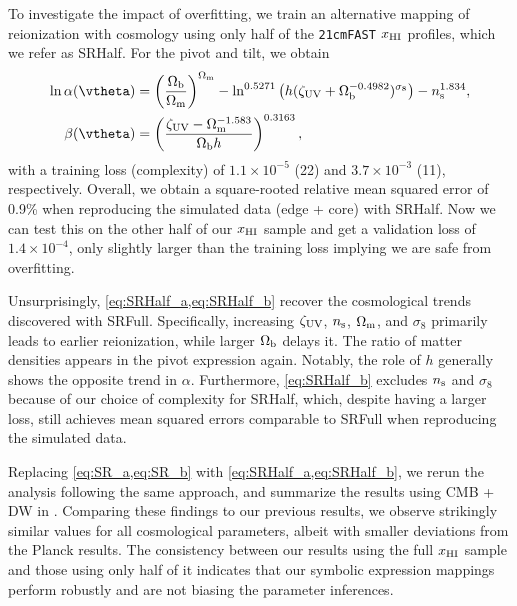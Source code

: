 To investigate the impact of overfitting, we train an alternative
mapping of reionization with cosmology using only half of the
\texttt{21cmFAST} $x_{\mathrm{HI}}$ profiles, which we refer as SRHalf.
For the pivot and tilt, we obtain
%
\begin{align}
\ln\ap(\vtheta) &= \left(\frac{\Omegab}{\Omegam}\right)^{\Omegam} - \ln^{0.5271}{\left(h(\zetaUV + \Omegab^{-0.4982})^{\sigma_8} \right) - \ns^{1.834}}, \label{eq:SRHalf_a} \\
\beta(\vtheta) &= \left( \frac{\zetaUV - \Omegam^{-1.583}}{\Omegab h }\right)^{0.3163}, \label{eq:SRHalf_b}
\end{align}
%
with a training loss (complexity) of $1.1 \times 10^{-5}$ (22) and $3.7 \times 10^{-3}$ (11), respectively. 
Overall, we obtain a square-rooted relative mean squared error of 0.9\% when 
reproducing the simulated data (edge + core) with SRHalf. 
Now we can test this on the other half of our $x_{\mathrm{HI}}$ sample and get a
validation loss of $1.4 \times 10^{-4}$, only slightly larger than the
training loss implying we are safe from overfitting.

Unsurprisingly, \cref{eq:SRHalf_a,eq:SRHalf_b} recover the cosmological trends
discovered with SRFull. Specifically, increasing $\zeta_\mathrm{UV}$, $n_\mathrm{s}$, $\Omega_\mathrm{m}$, 
and $\sigma_8$ primarily leads to earlier reionization, 
while larger $\Omega_\mathrm{b}$ delays it. The ratio of
matter densities appears in the pivot expression again. Notably, the
role of $h$ generally shows the opposite trend in $\alpha$. 
Furthermore, \cref{eq:SRHalf_b} excludes $n_\mathrm{s}$
and $\sigma_8$ because of our choice of complexity for SRHalf, 
which, despite having a larger loss, still achieves mean squared errors
comparable to SRFull when reproducing the simulated data.

Replacing \cref{eq:SR_a,eq:SR_b} with \cref{eq:SRHalf_a,eq:SRHalf_b}, we rerun
the analysis following the same approach, and summarize the results using 
CMB + DW in .
Comparing these findings to our previous results, we observe strikingly
similar values for all cosmological parameters, albeit with smaller
deviations from the Planck results.
The consistency between our results using the full $x_{\mathrm{HI}}$ sample and
those using only half of it indicates that our symbolic expression
mappings perform robustly and are not biasing the parameter inferences.


